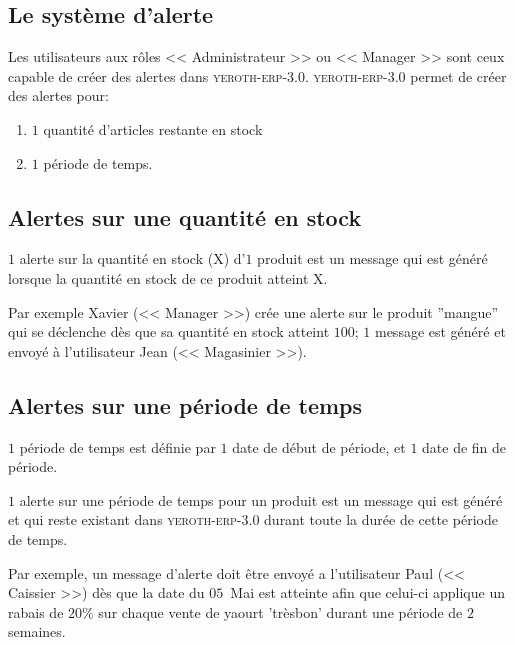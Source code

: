 \documentclass[a4paper, 10pt]{article}
\newcommand{\yeroth}{\textsc{yeroth-erp-3.0}\xspace}
\newcommand{\manager}{<< Manager >>\xspace}
\newcommand{\caissier}{<< Caissier >>\xspace}
\newcommand{\administrateur}{<< Administrateur >>\xspace}
\newcommand{\magasinier}{<< Magasinier >>\xspace}
\begin{document}
\begin{multicols}{2}
\vspace{-1em}
\section{Le syst\`eme d'alerte}
\vspace{-0.5em}
Les utilisateurs aux r\^oles \administrateur ou
\manager sont ceux capable de cr\'eer des
alertes dans \yeroth.
\yeroth permet  de cr\'eer des alertes pour:
\begin{enumerate}[1.]
	\itemsep -0.5em
	\item $1$ quantit\'e d'articles restante en stock
	\item $1$ p\'eriode de temps.
\end{enumerate}

\vspace{-1em}

\subsection{Alertes sur une quantit\'e en stock}
\vspace{-0.1em}
$1$ alerte sur la quantit\'e en stock (X) d'$1$ produit
est un message qui est g\'en\'er\'e lorsque la
quantit\'e en stock de ce produit atteint X.

Par exemple Xavier (\manager) cr\'ee une alerte sur le
produit ''mangue'' qui se d\'eclenche d\`es que sa quantit\'e
en stock atteint $100$; $1$ message est g\'en\'er\'e et
envoy\'e \`a l'utilisateur Jean (\magasinier).

\vspace{-1em}

\subsection{Alertes sur une p\'eriode de temps}
\vspace{-0.1em}
$1$ p\'eriode de temps est d\'efinie par $1$ date
de d\'ebut de p\'eriode, et $1$ date de fin
de p\'eriode.

$1$ alerte sur une p\'eriode de temps pour un
produit est un message qui est g\'en\'er\'e et 
qui reste existant dans \yeroth durant toute la
dur\'ee de cette p\'eriode de temps.

Par exemple, un message d'alerte doit \^etre envoy\'e
a l'utilisateur Paul (\caissier) d\`es que
la date du $05$~Mai est atteinte afin que celui-ci
applique un rabais de $20\%$ sur chaque vente de
yaourt 'tr\`esbon' durant une p\'eriode de $2$ semaines.


\end{multicols}
\end{document}
